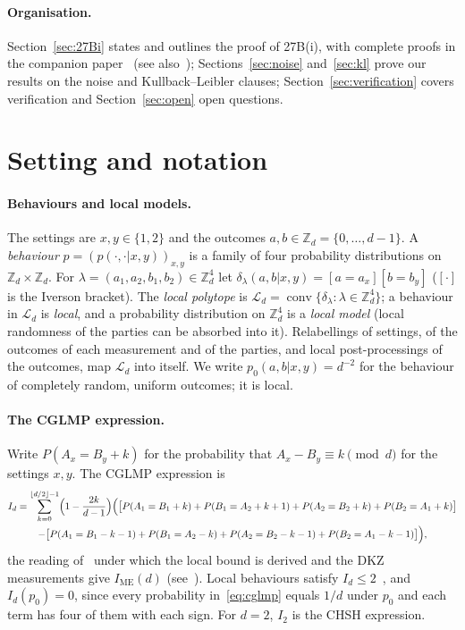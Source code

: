 \documentclass[11pt]{article}
\theoremstyle{remark}
\numberwithin{equation}{section}
\newcommand{\Z}{\mathbb{Z}}
\newcommand{\IME}{I_{\mathrm{ME}}}
\newcommand{\cL}{\mathcal{L}}
\begin{document}
\paragraph{Organisation.}
Section~\ref{sec:27Bi} states and outlines the proof of 27B(i), with complete proofs in the companion
paper~\cite{MSmath} (see also~\cite{MSoverview}); Sections~\ref{sec:noise} and~\ref{sec:kl} prove our results on the
noise and Kullback--Leibler clauses; Section~\ref{sec:verification} covers verification and Section~\ref{sec:open} open
questions.

\section{Setting and notation}\label{sec:setting}

\paragraph{Behaviours and local models.}
The settings are $x,y\in\{1,2\}$ and the outcomes $a,b\in\Z_d=\{0,\dots,d-1\}$. A \emph{behaviour}
$p=(p(\cdot,\cdot|x,y))_{x,y}$ is a family of four probability distributions on $\Z_d\times\Z_d$. For
$\lambda=(a_1,a_2,b_1,b_2)\in\Z_d^4$ let $\delta_\lambda(a,b|x,y)=[a=a_x][b=b_y]$ ($[\cdot]$ is the Iverson bracket).
The \emph{local polytope} is $\cL_d=\operatorname{conv}\{\delta_\lambda:\lambda\in\Z_d^4\}$; a behaviour in $\cL_d$ is
\emph{local}, and a probability distribution on $\Z_d^4$ is a \emph{local model} (local randomness of the parties can
be absorbed into it). Relabellings of settings, of the outcomes of each measurement and of the parties, and local
post-processings of the outcomes, map $\cL_d$ into itself. We write $p_0(a,b|x,y)=d^{-2}$ for the behaviour of
completely random, uniform outcomes; it is local.

\paragraph{The CGLMP expression.}
Write $P(A_x=B_y+k)$ for the probability that $A_x-B_y\equiv k\pmod d$ for the settings $x,y$. The CGLMP expression is
\begin{multline}\label{eq:cglmp}
I_d=\sum_{k=0}^{\lfloor d/2\rfloor-1}\Bigl(1-\frac{2k}{d-1}\Bigr)\Bigl(\bigl[P(A_1=B_1+k)+P(B_1=A_2+k+1)
+P(A_2=B_2+k)+P(B_2=A_1+k)\bigr]\\
-\bigl[P(A_1=B_1-k-1)+P(B_1=A_2-k)+P(A_2=B_2-k-1)+P(B_2=A_1-k-1)\bigr]\Bigr),
\end{multline}
the reading of~\cite{CGLMP} under which the local bound is derived and the DKZ measurements give $\IME(d)$
(see~\cite[Section~2]{MSclassical}). Local behaviours satisfy $I_d\le2$~\cite{CGLMP}, and $I_d(p_0)=0$, since every
probability in~\eqref{eq:cglmp} equals $1/d$ under $p_0$ and each term has four of them with each sign. For $d=2$,
$I_2$ is the CHSH expression.
\end{document}
